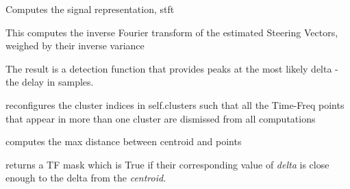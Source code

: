 \documentclass[letterpaper,10pt,english]{sphinxmanual}
\begin{document}
\begin{fulllineitems}
\begin{fulllineitems}
\end{fulllineitems}


\begin{fulllineitems}
\label{reference/demix:pyfasst.demixTF.DEMIX.comp_sig_repr}
Computes the signal representation, stft

\end{fulllineitems}


\begin{fulllineitems}
\label{reference/demix:pyfasst.demixTF.DEMIX.compute_temporal}
This computes the inverse Fourier transform of the
estimated Steering Vectors, weighed by their inverse variance

The result is a detection function that provides peaks at the
most likely delta - the delay in samples.

\end{fulllineitems}


\begin{fulllineitems}
\label{reference/demix:pyfasst.demixTF.DEMIX.create_exclusive_clusters}
reconfigures the cluster indices in self.clusters such
that all the Time-Freq points that appear in more than
one cluster are dismissed from all computations

\end{fulllineitems}


\begin{fulllineitems}
\label{reference/demix:pyfasst.demixTF.DEMIX.estimDAOBound}
computes the max distance between centroid and points

\end{fulllineitems}


\begin{fulllineitems}
\label{reference/demix:pyfasst.demixTF.DEMIX.getTFPointsNearDelta}
returns a TF mask which is True if their corresponding value of
\emph{delta} is close enough to the delta from the \emph{centroid}.


\end{fulllineitems}
\end{fulllineitems}
\end{document}
